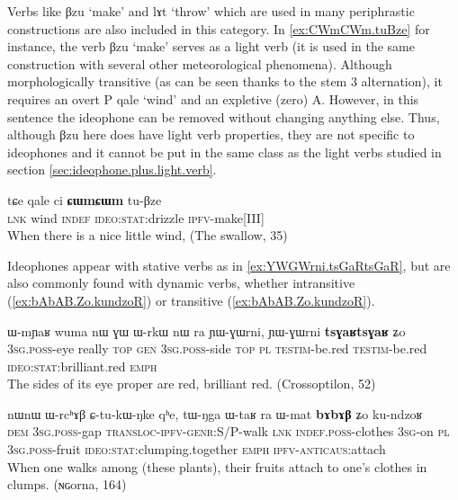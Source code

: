 \documentclass[oldfontcommands,oneside,a4paper,11pt]{article}
\newcommand{\ipa}[1]{{\phon \mbox{#1}}} %
\begin{document}
Verbs like \ipa{βzu} `make' and \ipa{lɤt} `throw' which are used in many periphrastic constructions are also included in this category. In \ref{ex:CWmCWm.tuBze} for instance, the verb \ipa{βzu} `make' serves as a light verb (it is used in the same construction with several other meteorological phenomena). Although morphologically transitive (as can be seen thanks to the stem 3 alternation), it requires an overt P \ipa{qale} `wind' and an expletive (zero) A. However, in this sentence the ideophone can be removed without changing anything else. Thus, although \ipa{βzu} here does have light verb properties, they are not specific to ideophones and it cannot be put in the same class as the light verbs studied in section \ref{sec:ideophone.plus.light.verb}.

\begin{exe}
\ex \label{ex:CWmCWm.tuBze}
\gll
\ipa{tɕe}  	\ipa{qale}  	\ipa{ci}  	\ipa{\textbf{ɕɯmɕɯm}}  	\ipa{tu-βze}  \\
\textsc{lnk} wind \textsc{indef} \textsc{ideo:stat}:drizzle \textsc{ipfv}-make[III] \\
\glt When there is a nice little wind, (The swallow, 35)
\end{exe}

Ideophones   appear with stative verbs as in \ref{ex:YWGWrni.tsGaRtsGaR}, but are also commonly found with 
dynamic verbs, whether intransitive (\ref{ex:bAbAB.Zo.kundzoR}) or transitive  (\ref{ex:bAbAB.Zo.kundzoR}).

\begin{exe}
\ex \label{ex:YWGWrni.tsGaRtsGaR}
\gll
\ipa{ɯ-mɲaʁ}  	\ipa{wuma}  	\ipa{nɯ}  	\ipa{ɣɯ}  	\ipa{ɯ-rkɯ}  	\ipa{nɯ} \ipa{ra}  	\ipa{ɲɯ-ɣɯrni,}  	\ipa{ɲɯ-ɣɯrni}  	\ipa{\textbf{tsɣaʁtsɣaʁ}}  	\ipa{ʑo}  \\
\textsc{3sg.poss}-eye really \textsc{top} \textsc{gen} \textsc{3sg.poss}-side \textsc{top} \textsc{pl} \textsc{testim}-be.red  \textsc{testim}-be.red \textsc{ideo:stat}:brilliant.red \textsc{emph} \\
 \glt The sides of its eye proper are red, brilliant red.  (Crossoptilon, 52)
 \end{exe}


\begin{exe}
\ex \label{ex:bAbAB.Zo.kundzoR}
\gll
\ipa{nɯnɯ}  	\ipa{ɯ-rcʰɤβ}  	\ipa{ɕ-tu-kɯ-ŋke}  	\ipa{qʰe,}  	\ipa{tɯ-ŋga}  	\ipa{ɯ-taʁ} \ipa{ra}  	\ipa{ɯ-mat}  	\ipa{\textbf{bɤbɤβ}}  	\ipa{ʑo}  	\ipa{ku-ndzoʁ} \\
\textsc{dem} \textsc{3sg.poss}-gap \textsc{transloc-ipfv-genr:}S/P-walk \textsc{lnk} \textsc{indef.poss}-clothes \textsc{3sg}-on \textsc{pl}  \textsc{3sg.poss}-fruit \textsc{ideo:stat}:clumping.together
\textsc{emph} \textsc{ipfv-anticaus}:attach \\
\glt When one walks among (these plants), their fruits attach to one's clothes in clumps. (ɴɢorna, 164)
\end{exe}
\end{document}
